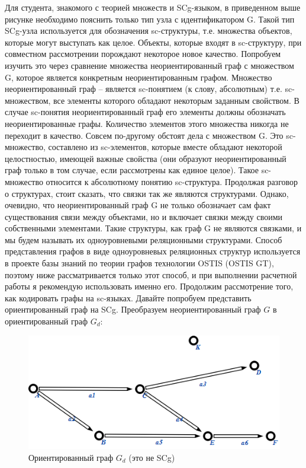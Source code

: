 Для студента, знакомого с теорией множеств и SCg-языком, в приведенном
выше рисунке необходимо пояснить только тип узла с идентификатором
G. Такой тип SCg-узла используется для обозначения sc-структуры,
т.е. множества объектов, которые могут выступать как целое. Объекты,
которые входят в sc-структуру, при совместном рассмотрении порождают
некоторое новое качество. Попробуем изучить это через сравнение
множества неориентированный граф с множеством G, которое является
конкретным неориентированным графом.  Множество неориентированный граф
– является sc-понятием (к слову, абсолютным) т.е. sc-множеством, все
элементы которого обладают некоторым заданным свойством. В случае
sc-понятия неориентированный граф его элементы должны обозначать
неориентированные графы. Количество элементов этого множества никогда
не переходит в качество. Совсем по-другому обстоят дела с множеством
G. Это sc-множество, составлено из sc-элементов, которые вместе
обладают некоторой целостностью, имеющей важные свойства (они образуют
неориентированный граф только в том случае, если рассмотрены как
единое целое). Такое sc-множество относится к абсолютному понятию
sc-структура.  Продолжая разговор о структурах, стоит сказать, что
связки так же являются структурами. Однако, очевидно, что
неориентированный граф G не только обозначает сам факт существования
связи между объектами, но и включает связки между своими собственными
элементами. Такие структуры, как граф G не являются связками, и мы
будем называть их одноуровневыми реляционными структурами.  Способ
представления графов в виде одноуровневых реляционных структур
используется в проекте базы знаний по теории графов технологии OSTIS
(OSTIS GT), поэтому ниже рассматривается только этот способ, и при
выполнении расчетной работы я рекомендую использовать именно
его. Продолжим рассмотрение того, как кодировать графы на sc-языках.
Давайте попробуем представить ориентированный граф на SCg. Преобразуем
неориентированный граф $G$ в ориентированный граф $G_d$:

\begin{figure}[h]
  \centering
  \includegraphics[scale=0.6]{images/2/Directed_graph_not_scg}
  \caption{Ориентированный граф $G_d$ (это не SCg)}
  \label{fig:Directed_graph_not_scg}
\end{figure}

